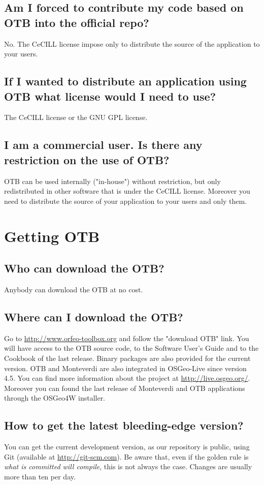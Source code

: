 \subsection{Am I forced to contribute my code based on OTB into the official repo?}
No. The CeCILL license impose only to distribute the source of the application to your users.

\subsection{If I wanted to distribute an application using OTB what license would I need to use?}
The CeCILL license or the GNU GPL license.

\subsection{I am a commercial user. Is there any restriction on the
  use of OTB?}
OTB can be used internally ("in-house") without restriction, but only
redistributed in other software that is under the CeCILL license. 
Moreover you need to distribute the source of your application to your
users and only them.

\section{Getting OTB}

\subsection{Who can download the OTB?}
Anybody can download the OTB at no cost.

\subsection{Where can I download the OTB?}
Go to \url{http://www.orfeo-toolbox.org}
 and follow the "download OTB" link. You will have access to the OTB
source code, to the Software User's Guide and to the Cookbook of the last release. 
Binary packages are also provided for the current version.
OTB and Monteverdi are also integrated in OSGeo-Live since version 4.5.
You can find more information about the project at \url{http://live.osgeo.org/}. 
Moreover you can found the last release of Monteverdi and OTB applications through 
the OSGeo4W installer. 

\subsection{How to get the latest bleeding-edge version?}\label{sec:FAQGit}
You can get the current development version, as our repository is public, using Git (available at \url{http://git-scm.com}). Be aware that, even if the golden rule is {\em what is committed will compile}, this is not always the case. Changes are usually more than ten per day.

